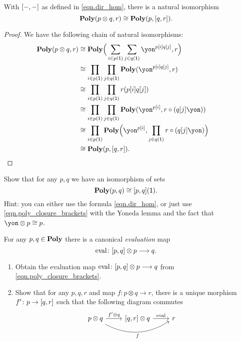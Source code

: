 \documentclass[DynamicalBook]{subfiles}
\begin{document}
\begin{proposition}\label{prop.dirichlet_closure}
With $[-,-]$ as defined in \eqref{eqn.dir_hom}, there is a natural isomorphism
\begin{equation}\label{eqn.poly_closure_brackets}
	\textbf{Poly}(p\otimes q,r)\cong\textbf{Poly}(p,[q,r]).
\end{equation}
\end{proposition}
\begin{proof}
We have the following chain of natural isomorphisms:
\begin{align*}
	\poly(p\otimes q,r)&\cong
	\poly\Big(\sum_{i\in p(\1)}\sum_{j\in q(\1)}\yon^{p[i]q[j]},r\Big)\\&\cong
	\prod_{i\in p(\1)}\prod_{j\in q(\1)}\poly(\yon^{p[i]q[j]},r)\\&\cong
	\prod_{i\in p(\1)}\prod_{j\in q(\1)}r(p[i]q[j])\\&\cong
	\prod_{i\in p(\1)}\prod_{j\in q(\1)}\poly(\yon^{p[i]},r\circ(q[j]\yon))\\&\cong
	\prod_{i\in p(\1)}\poly\Big(\yon^{p[i]},\prod_{j\in q(\1)}r\circ(q[j]\yon)\Big)\\&\cong
	\poly(p,\ihom{q,r}).&
	\qedhere
\end{align*}
\end{proof}

\begin{exercise}\label{exc.poly_plug_1}
Show that for any $p,q$ we have an isomorphism of sets
\[
\textbf{Poly}(p,q)\cong[p,q](\textsf{1}).
\]
Hint: you can either use the formula \eqref{eqn.dir_hom}, or just use 
\eqref{eqn.poly_closure_brackets} with the Yoneda lemma and the fact that $\yon\otimes p\cong p$.
\end{exercise}


For any $p,q\in\textbf{Poly}$ there is a canonical \emph{evaluation} map
\begin{equation}\label{eqn.eval_dirichlet}
  \mathrm{eval}\colon [p,q]\otimes p\longrightarrow q.
\end{equation}

\begin{exercise}
\begin{enumerate}
	\item Obtain the evaluation map $\mathrm{eval}\colon [p,q]\otimes p\longrightarrow q$ from \eqref{eqn.poly_closure_brackets}.
	\item Show that for any $p,q,r$ and map $f\colon p\otimes q\to r$, there is a unique morphism $f'\colon p\to[q,r]$ such that the following diagram commutes
	\[
	\begin{tikzcd}
		p\otimes q\ar[r, "f'\otimes q"]\ar[rr, bend right, "f"']&
		{\ihom{q,r}}\otimes q\ar[r, "\fun{eval}"]&
		r
	\end{tikzcd}
	\]
\qedhere
\end{enumerate}
\end{exercise}
\end{document}
